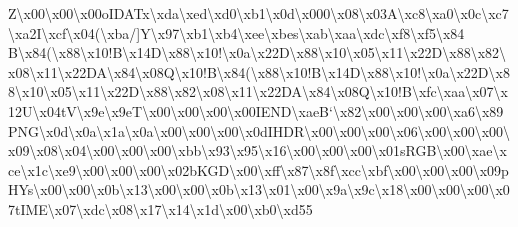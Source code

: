 \begin{DoxyCompactItemize}
Z\textbackslash{}x00\textbackslash{}x00\textbackslash{}x00o\+I\+D\+A\+Tx\textbackslash{}xda\textbackslash{}xed\textbackslash{}xd0\textbackslash{}xb1\textbackslash{}x0d\textbackslash{}x000\textbackslash{}x08\textbackslash{}x03\+A\textbackslash{}xc8\textbackslash{}xa0\textbackslash{}x0c\textbackslash{}xc7\textbackslash{}xa2\+I\textbackslash{}xcf\textbackslash{}x04(\textbackslash{}xba/\mbox{]}\+Y\textbackslash{}x97\textbackslash{}xb1\textbackslash{}xb4\textbackslash{}xee\textbackslash{}xbes\textbackslash{}xab\textbackslash{}xaa\textbackslash{}xdc\textbackslash{}xf8\textbackslash{}xf5\textbackslash{}x84 B\textbackslash{}x84(\textbackslash{}x88\textbackslash{}x10!\+B\textbackslash{}x14\+D\textbackslash{}x88\textbackslash{}x10!\textbackslash{}x0a\textbackslash{}x22\+D\textbackslash{}x88\textbackslash{}x10\textbackslash{}x05\textbackslash{}x11\textbackslash{}x22\+D\textbackslash{}x88\textbackslash{}x82\textbackslash{}x08\textbackslash{}x11\textbackslash{}x22\+D\+A\textbackslash{}x84\textbackslash{}x08\+Q\textbackslash{}x10!\+B\textbackslash{}x84(\textbackslash{}x88\textbackslash{}x10!\+B\textbackslash{}x14\+D\textbackslash{}x88\textbackslash{}x10!\textbackslash{}x0a\textbackslash{}x22\+D\textbackslash{}x88\textbackslash{}x10\textbackslash{}x05\textbackslash{}x11\textbackslash{}x22\+D\textbackslash{}x88\textbackslash{}x82\textbackslash{}x08\textbackslash{}x11\textbackslash{}x22\+D\+A\textbackslash{}x84\textbackslash{}x08\+Q\textbackslash{}x10!\+B\textbackslash{}xfc\textbackslash{}xaa\textbackslash{}x07\textbackslash{}x12\+U\textbackslash{}x04t\+V\textbackslash{}x9e\textbackslash{}x9e\+T\textbackslash{}x00\textbackslash{}x00\textbackslash{}x00\textbackslash{}x00\+I\+E\+N\+D\textbackslash{}xae\+B`\textbackslash{}x82\textbackslash{}x00\textbackslash{}x00\textbackslash{}x00\textbackslash{}xa6\textbackslash{}x89\+P\+N\+G\textbackslash{}x0d\textbackslash{}x0a\textbackslash{}x1a\textbackslash{}x0a\textbackslash{}x00\textbackslash{}x00\textbackslash{}x00\textbackslash{}x0d\+I\+H\+D\+R\textbackslash{}x00\textbackslash{}x00\textbackslash{}x00\textbackslash{}x06\textbackslash{}x00\textbackslash{}x00\textbackslash{}x00\textbackslash{}x09\textbackslash{}x08\textbackslash{}x04\textbackslash{}x00\textbackslash{}x00\textbackslash{}x00\textbackslash{}xbb\textbackslash{}x93\textbackslash{}x95\textbackslash{}x16\textbackslash{}x00\textbackslash{}x00\textbackslash{}x00\textbackslash{}x01s\+R\+G\+B\textbackslash{}x00\textbackslash{}xae\textbackslash{}xce\textbackslash{}x1c\textbackslash{}xe9\textbackslash{}x00\textbackslash{}x00\textbackslash{}x00\textbackslash{}x02b\+K\+G\+D\textbackslash{}x00\textbackslash{}xff\textbackslash{}x87\textbackslash{}x8f\textbackslash{}xcc\textbackslash{}xbf\textbackslash{}x00\textbackslash{}x00\textbackslash{}x00\textbackslash{}x09p\+H\+Ys\textbackslash{}x00\textbackslash{}x00\textbackslash{}x0b\textbackslash{}x13\textbackslash{}x00\textbackslash{}x00\textbackslash{}x0b\textbackslash{}x13\textbackslash{}x01\textbackslash{}x00\textbackslash{}x9a\textbackslash{}x9c\textbackslash{}x18\textbackslash{}x00\textbackslash{}x00\textbackslash{}x00\textbackslash{}x07t\+I\+M\+E\textbackslash{}x07\textbackslash{}xdc\textbackslash{}x08\textbackslash{}x17\textbackslash{}x14\textbackslash{}x1d\textbackslash{}x00\textbackslash{}xb0\textbackslash{}xd55\textbackslas
\end{DoxyCompactItemize}
